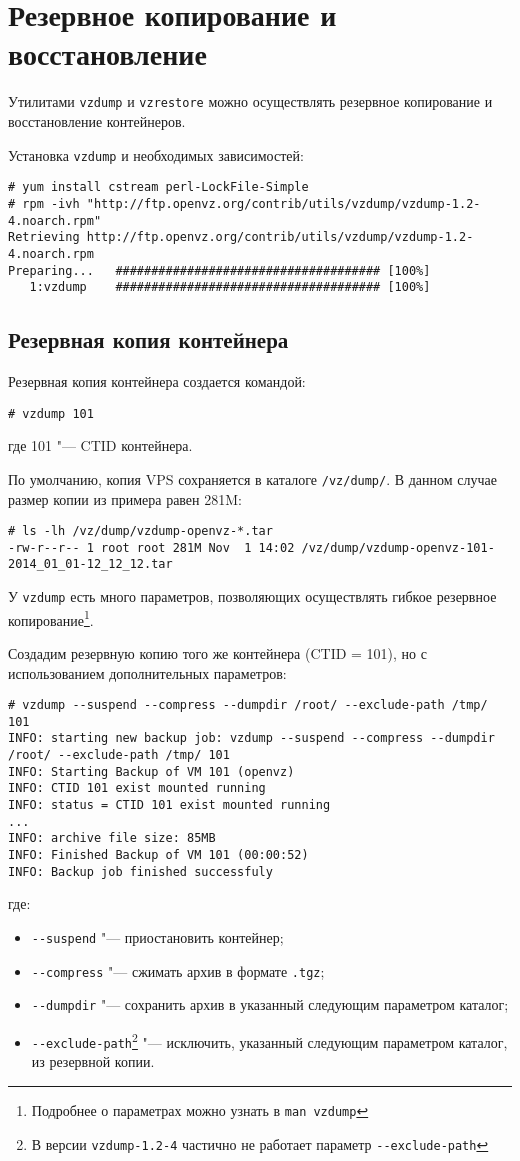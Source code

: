 \section{Резервное копирование и восстановление}

Утилитами \texttt{vzdump} и \texttt{vzrestore} можно осуществлять резервное копирование и восстановление контейнеров.

Установка \texttt{vzdump} и необходимых зависимостей:
\begin{lstlisting}
# yum install cstream perl-LockFile-Simple
# rpm -ivh "http://ftp.openvz.org/contrib/utils/vzdump/vzdump-1.2-4.noarch.rpm"
Retrieving http://ftp.openvz.org/contrib/utils/vzdump/vzdump-1.2-4.noarch.rpm
Preparing...   ##################################### [100%]
   1:vzdump    ##################################### [100%]
\end{lstlisting}

\subsection{Резервная копия контейнера}
Резервная копия контейнера создается командой:
\begin{lstlisting}
# vzdump 101
\end{lstlisting}
где 101 "--- CTID контейнера.

По умолчанию, копия VPS сохраняется в каталоге \texttt{/vz/dump/}.
В данном случае размер копии из примера равен 281M:
\begin{lstlisting}
# ls -lh /vz/dump/vzdump-openvz-*.tar 
-rw-r--r-- 1 root root 281M Nov  1 14:02 /vz/dump/vzdump-openvz-101-2014_01_01-12_12_12.tar
\end{lstlisting}

У \texttt{vzdump} есть много параметров, позволяющих осуществлять гибкое резервное копирование\footnote{Подробнее о параметрах можно узнать в \texttt{man vzdump}}.

Создадим резервную копию того же контейнера (CTID = 101), но с использованием дополнительных параметров:
\begin{lstlisting}
# vzdump --suspend --compress --dumpdir /root/ --exclude-path /tmp/ 101
INFO: starting new backup job: vzdump --suspend --compress --dumpdir /root/ --exclude-path /tmp/ 101
INFO: Starting Backup of VM 101 (openvz)
INFO: CTID 101 exist mounted running
INFO: status = CTID 101 exist mounted running
...
INFO: archive file size: 85MB
INFO: Finished Backup of VM 101 (00:00:52)
INFO: Backup job finished successfuly
\end{lstlisting}
где:
\begin{itemize}
    \item \texttt{-{}-suspend} "--- приостановить контейнер;
    \item \texttt{-{}-compress} "--- сжимать архив в формате \texttt{.tgz};
    \item \texttt{-{}-dumpdir} "--- сохранить архив в указанный следующим параметром каталог;
    \item \texttt{-{}-exclude-path}\footnote{В версии \texttt{vzdump-1.2-4} частично не работает параметр \texttt{-{}-exclude-path}} "--- исключить, указанный следующим параметром каталог, из резервной копии.
\end{itemize}

